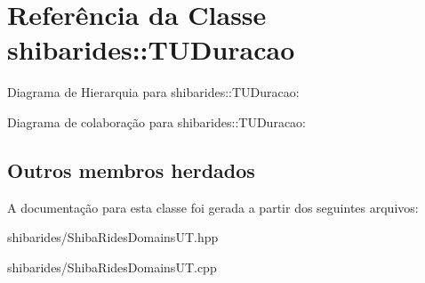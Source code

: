 \hypertarget{classshibarides_1_1TUDuracao}{}\section{Referência da Classe shibarides\+:\+:T\+U\+Duracao}
\label{classshibarides_1_1TUDuracao}


Diagrama de Hierarquia para shibarides\+:\+:T\+U\+Duracao\+:


Diagrama de colaboração para shibarides\+:\+:T\+U\+Duracao\+:
\subsection*{Outros membros herdados}


A documentação para esta classe foi gerada a partir dos seguintes arquivos\+:\begin{DoxyCompactItemize}
\item 
shibarides/Shiba\+Rides\+Domains\+U\+T.\+hpp\item 
shibarides/Shiba\+Rides\+Domains\+U\+T.\+cpp\end{DoxyCompactItemize}

